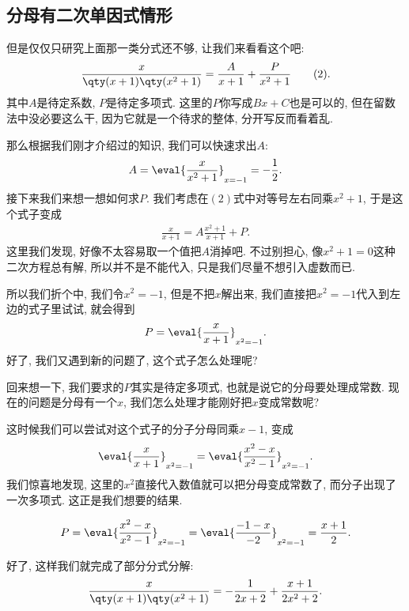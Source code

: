 \documentclass{ctexbook}
\begin{document}
{\subsection{分母有二次单因式情形}
但是仅仅只研究上面那一类分式还不够, 让我们来看看这个吧: 
\begin{align*}
\frac{x}{\qty(x+1)\qty(x^{2}+1)}=\frac{A}{x+1}+\frac{P}{x^{2}+1}\tag{2}
.\end{align*}
其中$A$是待定系数, $P$是待定多项式. 这里的$P$你写成$Bx+C$也是可以的, 但在留数法中没必要这么干, 因为它就是一个待求的整体, 分开写反而看着乱. \par
那么根据我们刚才介绍过的知识, 我们可以快速求出$A$: 
\begin{align*}
A=\eval{\frac{x}{x^{2}+1}}_{x=-1}=-\frac{1}{2}
.\end{align*}
接下来我们来想一想如何求$P$. 我们考虑在$(2)$式中对等号左右同乘$x^{2}+1$, 于是这个式子变成
\begin{align*}
\frac{x}{x+1}=A\frac{x^{2}+1}{x+1}+P
.\end{align*}
这里我们发现, 好像不太容易取一个值把$A$消掉吧. 不过别担心, 像$x^{2}+1=0$这种二次方程总有解, 所以并不是不能代入, 只是我们尽量不想引入虚数而已. \par
所以我们折个中, 我们令$x^{2}=-1$, 但是不把$x$解出来, 我们直接把$x^{2}=-1$代入到左边的式子里试试, 就会得到
\begin{align*}
P=\eval{\frac{x}{x+1}}_{x^{2}=-1}
.\end{align*}
好了, 我们又遇到新的问题了, 这个式子怎么处理呢? \par
回来想一下, 我们要求的$P$其实是待定多项式, 也就是说它的分母要处理成常数. 现在的问题是分母有一个$x$, 我们怎么处理才能刚好把$x$变成常数呢? \par
这时候我们可以尝试对这个式子的分子分母同乘$x-1$, 变成
\begin{align*}
\eval{\frac{x}{x+1}}_{x^{2}=-1}=\eval{\frac{x^{2}-x}{x^{2}-1}}_{x^{2}=-1}
.\end{align*}
我们惊喜地发现, 这里的$x^{2}$直接代入数值就可以把分母变成常数了, 而分子出现了一次多项式. 这正是我们想要的结果. \par
\begin{align*}
P=\eval{\frac{x^{2}-x}{x^{2}-1}}_{x^{2}=-1}=\eval{\frac{-1-x}{-2}}_{x^{2}=-1}=\frac{x+1}{2}
.\end{align*}\par
好了, 这样我们就完成了部分分式分解: 
\begin{align*}
\frac{x}{\qty(x+1)\qty(x^{2}+1)}=-\frac{1}{2x+2}+\frac{x+1}{2x^{2}+2}
.\end{align*}\par
}
\end{document}
